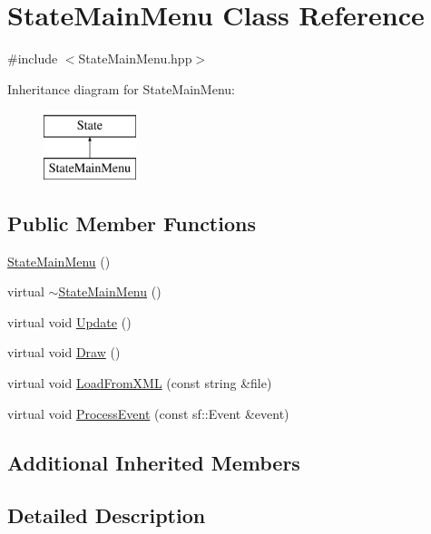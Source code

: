 \hypertarget{class_state_main_menu}{\section{State\-Main\-Menu Class Reference}
\label{class_state_main_menu}
}


{\ttfamily \#include $<$State\-Main\-Menu.\-hpp$>$}

Inheritance diagram for State\-Main\-Menu\-:\begin{figure}[H]
\begin{center}
\leavevmode
\includegraphics[height=2.000000cm]{class_state_main_menu}
\end{center}
\end{figure}
\subsection*{Public Member Functions}
\begin{DoxyCompactItemize}
\item 
\hyperlink{class_state_main_menu_af1bc1b6bfef9775a92eda9dd4c5f8d80}{State\-Main\-Menu} ()
\item 
virtual \hyperlink{class_state_main_menu_aae1ad451be64082e6e8f021d72d2050c}{$\sim$\-State\-Main\-Menu} ()
\item 
virtual void \hyperlink{class_state_main_menu_afa9c12c0975a2af95fdd2cf1829c56df}{Update} ()
\item 
virtual void \hyperlink{class_state_main_menu_acd8b820dddbd9bd5515b1a3cebbe6978}{Draw} ()
\item 
virtual void \hyperlink{class_state_main_menu_a988befa6ae7c087935581b269fb8863f}{Load\-From\-X\-M\-L} (const string \&file)
\item 
virtual void \hyperlink{class_state_main_menu_ac9a02be51b4faa9c7d82e10af97ef6e4}{Process\-Event} (const sf\-::\-Event \&event)
\end{DoxyCompactItemize}
\subsection*{Additional Inherited Members}


\subsection{Detailed Description}


